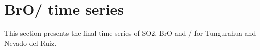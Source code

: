 \documentclass  [
  paper    = a4,
  BCOR     = 10mm,
  twoside,
  fontsize = 12pt,
  fleqn,
  toc      = bibnumbered,
  toc      = listofnumbered,
  numbers  = noendperiod,
  headings = normal,
  listof   = leveldown,
  version  = 3.03
]                                       {scrreprt}
\begin{document}
\section{BrO/  time series}

This section presents the final time series of SO2, BrO and /  for Tungurahua and Nevado del Ruiz.\\


\end{document}
